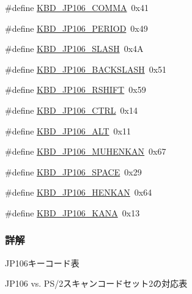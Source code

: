 \begin{DoxyCompactItemize}
\item 
\#define \hyperlink{kbd__jp106_8h_a5b5e1442336dbe3ec6cd8b19b97e0154_a5b5e1442336dbe3ec6cd8b19b97e0154}{K\+B\+D\+\_\+\+J\+P106\+\_\+\+C\+O\+M\+M\+A}~0x41
\item 
\#define \hyperlink{kbd__jp106_8h_a162aa7e112b491c33f8b06d0481a9a74_a162aa7e112b491c33f8b06d0481a9a74}{K\+B\+D\+\_\+\+J\+P106\+\_\+\+P\+E\+R\+I\+O\+D}~0x49
\item 
\#define \hyperlink{kbd__jp106_8h_a96ff4923d0aaaf8e9b382f1a01adc92c_a96ff4923d0aaaf8e9b382f1a01adc92c}{K\+B\+D\+\_\+\+J\+P106\+\_\+\+S\+L\+A\+S\+H}~0x4\+A
\item 
\#define \hyperlink{kbd__jp106_8h_aa1fc92748cb0e4397218d79bc141d7d3_aa1fc92748cb0e4397218d79bc141d7d3}{K\+B\+D\+\_\+\+J\+P106\+\_\+\+B\+A\+C\+K\+S\+L\+A\+S\+H}~0x51
\item 
\#define \hyperlink{kbd__jp106_8h_a25dda2531664c4cd77d393fb40c1671e_a25dda2531664c4cd77d393fb40c1671e}{K\+B\+D\+\_\+\+J\+P106\+\_\+\+R\+S\+H\+I\+F\+T}~0x59
\item 
\#define \hyperlink{kbd__jp106_8h_a4088467df0085e42ee15bb3104a56452_a4088467df0085e42ee15bb3104a56452}{K\+B\+D\+\_\+\+J\+P106\+\_\+\+C\+T\+R\+L}~0x14
\item 
\#define \hyperlink{kbd__jp106_8h_a7f95154140d3c1960e38d0cb11a4537a_a7f95154140d3c1960e38d0cb11a4537a}{K\+B\+D\+\_\+\+J\+P106\+\_\+\+A\+L\+T}~0x11
\item 
\#define \hyperlink{kbd__jp106_8h_abc9fec2af13aceb8a55d6b2f1a8365c9_abc9fec2af13aceb8a55d6b2f1a8365c9}{K\+B\+D\+\_\+\+J\+P106\+\_\+\+M\+U\+H\+E\+N\+K\+A\+N}~0x67
\item 
\#define \hyperlink{kbd__jp106_8h_a7269b56b895cff49c5a37236b81d5c5d_a7269b56b895cff49c5a37236b81d5c5d}{K\+B\+D\+\_\+\+J\+P106\+\_\+\+S\+P\+A\+C\+E}~0x29
\item 
\#define \hyperlink{kbd__jp106_8h_a02518d53b74bc906c88115386e99605a_a02518d53b74bc906c88115386e99605a}{K\+B\+D\+\_\+\+J\+P106\+\_\+\+H\+E\+N\+K\+A\+N}~0x64
\item 
\#define \hyperlink{kbd__jp106_8h_ae7ab5a1feec3630856436e22cc45cb62_ae7ab5a1feec3630856436e22cc45cb62}{K\+B\+D\+\_\+\+J\+P106\+\_\+\+K\+A\+N\+A}~0x13
\end{DoxyCompactItemize}


\subsubsection{詳解}
J\+P106キーコード表 

J\+P106 vs. P\+S/2スキャンコードセット2の対応表

